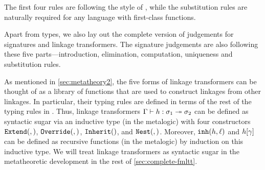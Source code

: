 The first four rules are following the style of \citet{program2013homotopy, pfenning2009lecture}, while the substitution rules are naturally required for any language with first-class functions.

Apart from types, we also lay out the complete version of judgements for signatures and linkage transformers. The signature judgements are also following these five parts---introduction, elimination, computation, uniqueness and substitution rules.










%

As mentioned in \cref{sec:metatheory2}, the five forms of linkage transformers can be
thought of as a library of functions that are used to construct linkages from other
linkages.
In particular, their typing rules are defined in terms of the rest of the typing
rules in \TT.
Thus, linkage transformers $ {\Gamma} \vdash {h} : {\sigma_1} \twoheadrightarrow {\ensuremath{\sigma}_2}$ can be defined
as syntactic sugar via an inductive type (in the meta\-logic) with four constructors
$\texttt{Extend}({},{})$, $\texttt{Override}({},{})$, $\texttt{Inherit}({})$, and $\texttt{Nest}({},{})$.
Moreover, $\texttt{inh}({h},{\ell})$ and ${h}\!\left[{\gamma}\right]$ can be defined
as recursive functions (in the meta\-logic) by induction on this inductive type.
We will treat linkage transformers as syntactic sugar in the meta\-theoretic development
in the rest of \cref{sec:complete-fmltt}.

